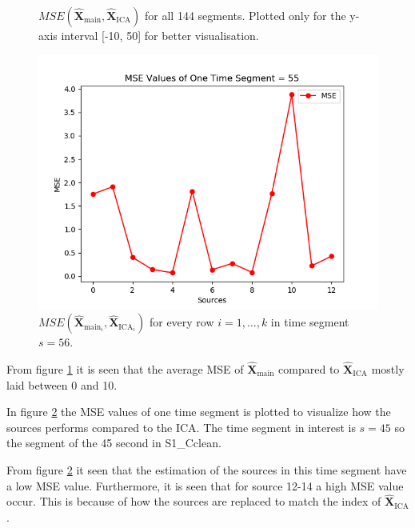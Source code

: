 \begin{figure}[H]
\begin{minipage}[t]{.45\textwidth}
	\caption{$MSE\left(\hat{\mathbf{X}}_{\text{main}},\hat{\mathbf{X}}_{\text{ICA}}\right)$ for all 144 segments. Plotted only for the y-axis interval [-10, 50] for better visualisation.}
	\label{fig:M=N_1_2}
    \end{minipage}
\end{figure}
\noindent 
 
\begin{figure}[H]
\centering
\includegraphics[scale=0.5]{figures/ch_7/mse_non_removed_ica_timeseg54.png}
\caption{$MSE\left(\hat{\mathbf{X}}_{\text{main}_{i}},\hat{\mathbf{X}}_{\text{ICA}_{i}}\right)$ for every row $i = 1, \hdots, k$ in time segment $s=56$.}
\label{fig:M=N_2}
\end{figure}
\noindent
From figure \ref{fig:M=N_1_2} it is seen that the average MSE of $\hat{\mathbf{X}}_{\text{main}}$ compared to $\hat{\mathbf{X}}_{\text{ICA}}$ mostly laid between 0 and 10. 

In figure \ref{fig:M=N_2} the MSE values of one time segment is plotted to visualize how the sources performs compared to the ICA. The time segment in interest is $s = 45$ so the segment of the 45 second in S1\_Cclean. 

From figure \ref{fig:M=N_2} it seen that the estimation of the sources in this time segment have a low MSE value. Furthermore, it is seen that for source 12-14 a high MSE value occur. This is because of how the sources are replaced to match the index of $\hat{\mathbf{X}}_{\text{ICA}}$.

